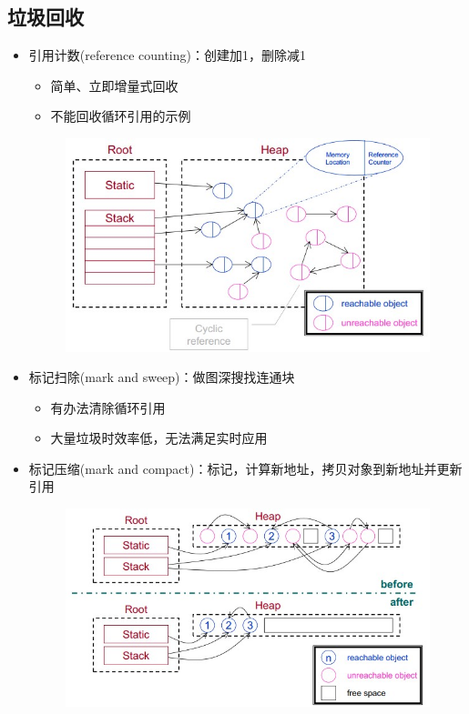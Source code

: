 \subsection{垃圾回收}
\begin{itemize}
	\item 引用计数(reference counting)：创建加1，删除减1
	\begin{itemize}
		\item 简单、立即增量式回收
		\item 不能回收循环引用的示例
	\end{itemize}
	\begin{figure}[H]
	\centering
	\includegraphics[width=0.8\linewidth]{fig/reference_counting.jpg}
	\end{figure}
	\item 标记扫除(mark and sweep)：做图深搜找连通块
	\begin{itemize}
		\item 有办法清除循环引用
		\item 大量垃圾时效率低，无法满足实时应用
	\end{itemize}
	\item 标记压缩(mark and compact)：标记，计算新地址，拷贝对象到新地址并更新引用
	\begin{figure}[H]
	\centering
	\includegraphics[width=0.8\linewidth]{fig/mark_and_compact.jpg}
	\end{figure}

\end{itemize}
